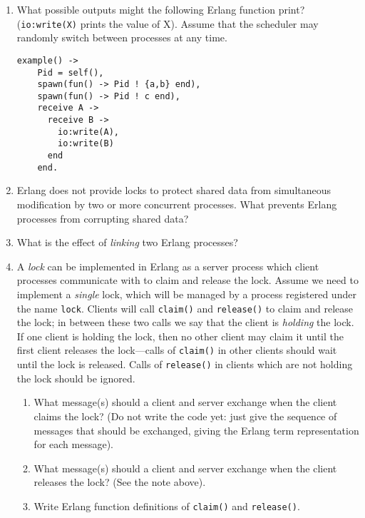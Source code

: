 \documentclass{article}
\begin{document}
\begin{enumerate}

\item
What possible outputs might the following Erlang function print?
(\verb!io:write(X)! prints the value of X). Assume that the scheduler
may randomly switch between processes at any time.
\begin{verbatim}
example() ->
    Pid = self(),
    spawn(fun() -> Pid ! {a,b} end),
    spawn(fun() -> Pid ! c end),
    receive A ->
      receive B ->
        io:write(A),
        io:write(B)
      end
    end.
\end{verbatim}

\item 
Erlang does not provide locks to protect shared data from simultaneous
modification by two or more concurrent processes. What prevents Erlang
processes from corrupting shared data?

\item
What is the effect of {\em linking} two Erlang processes?

\item
A {\em lock} can be implemented in Erlang as a server process which
client processes communicate with to claim and release the lock.
Assume we need to implement a {\em single} lock, which will be managed
by a process registered under the name \verb!lock!. Clients will call
\verb!claim()! and \verb!release()! to claim and release the lock; in
between these two calls we say that the client is {\em holding} the
lock.  If one client is holding the lock, then no other client may
claim it until the first client releases the lock---calls of
\verb!claim()!  in other clients should wait until the lock is
released. Calls of \verb!release()! in clients which are not holding
the lock should be ignored.
\begin{enumerate}
\item
What message(s) should a client and server exchange when the client
claims the lock? (Do not write the code yet: just give the sequence of
messages that should be exchanged, giving the Erlang term
representation for each message).

\item
What message(s) should a client and server exchange when the client
releases the lock? (See the note above).

\item
Write Erlang function definitions of \verb!claim()! and
\verb!release()!.


\end{enumerate}
\end{enumerate}
\end{document}
